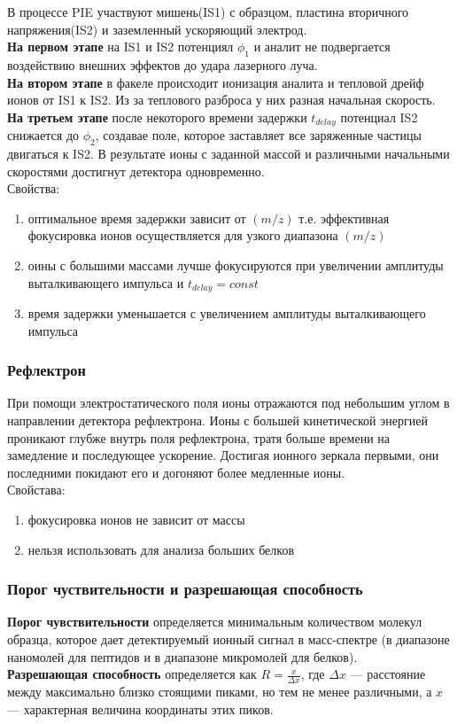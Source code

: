 \documentclass[12pt]{article}
\begin{document}
\begin{flushleft}
В процессе PIE участвуют мишень(IS1) с образцом, пластина вторичного напряжения(IS2) и заземленный ускоряющий электрод.\\
\textbf{На первом этапе} на IS1 и IS2 потенциял $\phi_1$ и аналит не подвергается воздействию внешних эффектов до удара лазерного луча.\\
\textbf{На втором этапе} в факеле происходит ионизация аналита и тепловой дрейф ионов от IS1 к IS2. Из за теплового разброса у них разная начальная скорость.\\
\textbf{На третьем этапе} после некоторого времени задержки $t_{delay}$ потенциал IS2 снижается до $\phi_2$, создавае поле, которое заставляет все заряженные частицы двигаться к IS2. В результате ионы с заданной массой и различными начальными скоростями достигнут детектора одновременно.\\
Свойства:
\begin{enumerate}
\item оптимальное время задержки зависит от $(m/z)$ т.е. эффективная фокусировка ионов осуществляется для узкого диапазона $(m/z)$
\item оины с большими массами лучше фокусируются при увеличении амплитуды выталкивающего импульса и $t_{delay}=const$
\item время задержки уменьшается с увеличением амплитуды выталкивающего импульса
\end{enumerate}
\subsubsection{Рефлектрон}

При помощи электростатического поля ионы отражаются под небольшим углом в направлении детектора рефлектрона. Ионы с большей кинетической энергией проникают глубже внутрь поля рефлектрона, тратя больше времени на замедление и последующее ускорение. Достигая ионного зеркала первыми, они последними покидают его и догоняют более медленные ионы.\\
Свойстава:
\begin{enumerate}
\item фокусировка ионов не зависит от массы
\item нельзя использовать для анализа больших белков
\end{enumerate}
\subsubsection{Порог чуствительности и разрешающая способность}
\textbf{Порог чувствительности} определяется минимальным количеством молекул образца, которое  дает детектируемый ионный сигнал в масс-спектре (в диапазоне наномолей для пептидов и в диапазоне микромолей для белков).\\
\textbf{Разрешающая способность} определяется как $R=\frac{x}{\Delta x}$,
где $\Delta x$ — расстояние между максимально близко стоящими пиками, но тем не менее различными, а $x$ — характерная величина координаты этих пиков. 

\end{flushleft}
\end{document}
